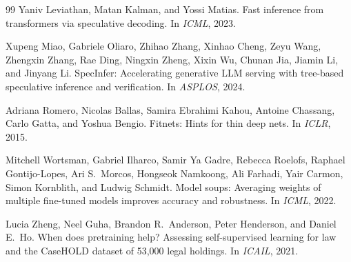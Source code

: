 \documentclass[11pt,a4paper]{article}
\begin{document}
\begin{thebibliography}{99}
Yaniv Leviathan, Matan Kalman, and Yossi Matias.
\newblock Fast inference from transformers via speculative decoding.
\newblock In \emph{ICML}, 2023.

Xupeng Miao, Gabriele Oliaro, Zhihao Zhang, Xinhao Cheng, Zeyu Wang,
Zhengxin Zhang, Rae Ding, Ningxin Zheng, Xixin Wu, Chunan Jia, Jiamin Li,
and Jinyang Li.
\newblock SpecInfer: Accelerating generative LLM serving with tree-based
  speculative inference and verification.
\newblock In \emph{ASPLOS}, 2024.

Adriana Romero, Nicolas Ballas, Samira Ebrahimi Kahou, Antoine Chassang,
Carlo Gatta, and Yoshua Bengio.
\newblock Fitnets: Hints for thin deep nets.
\newblock In \emph{ICLR}, 2015.

Mitchell Wortsman, Gabriel Ilharco, Samir Ya Gadre, Rebecca Roelofs,
Raphael Gontijo-Lopes, Ari S.\ Morcos, Hongseok Namkoong, Ali Farhadi,
Yair Carmon, Simon Kornblith, and Ludwig Schmidt.
\newblock Model soups: Averaging weights of multiple fine-tuned models improves
  accuracy and robustness.
\newblock In \emph{ICML}, 2022.

Lucia Zheng, Neel Guha, Brandon R.\ Anderson, Peter Henderson, and
Daniel E.\ Ho.
\newblock When does pretraining help? Assessing self-supervised learning for
  law and the CaseHOLD dataset of 53,000 legal holdings.
\newblock In \emph{ICAIL}, 2021.

\end{thebibliography}
\end{document}
